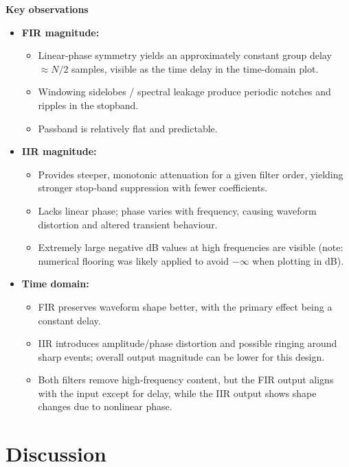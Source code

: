 \documentclass[11pt]{article}
\begin{document}
\noindent\textbf{Key observations}
\begin{itemize}
    \item \textbf{FIR magnitude:}
          \begin{itemize}
              \item Linear‑phase symmetry yields an approximately constant group delay $\approx N/2$ samples, visible as the time delay in the time‑domain plot.
              \item Windowing sidelobes / spectral leakage produce periodic notches and ripples in the stopband.
              \item Passband is relatively flat and predictable.
          \end{itemize}

    \item \textbf{IIR magnitude:}
          \begin{itemize}
              \item Provides steeper, monotonic attenuation for a given filter order, yielding stronger stop‑band suppression with fewer coefficients.
              \item Lacks linear phase; phase varies with frequency, causing waveform distortion and altered transient behaviour.
              \item Extremely large negative dB values at high frequencies are visible (note: numerical flooring was likely applied to avoid $-\infty$ when plotting in dB).
          \end{itemize}

    \item \textbf{Time domain:}
          \begin{itemize}
              \item FIR preserves waveform shape better, with the primary effect being a constant delay.
              \item IIR introduces amplitude/phase distortion and possible ringing around sharp events; overall output magnitude can be lower for this design.
              \item Both filters remove high‑frequency content, but the FIR output aligns with the input except for delay, while the IIR output shows shape changes due to nonlinear phase.
          \end{itemize}
\end{itemize}

\section*{Discussion}
\end{document}

